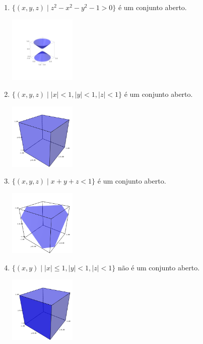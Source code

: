 \documentclass[../main.tex]{subfiles}
\begin{document}
		\begin{solucao}
			\begin{enumerate}[label=\alph*)]
				\item $\{(x,y,z) \mid z^2-x^2-y^2-1>0\}$ é um conjunto aberto.
				\begin{center}
					\includegraphics[width=0.25\textwidth]{imagens/lista03/picture_lista03.02_q02_item01.png}
				\end{center}
				\item $\{(x,y,z) \mid |x|<1, |y|<1, |z|<1\}$ é um conjunto aberto.
				\begin{center}
					\includegraphics[width=0.25\textwidth]{imagens/lista03/picture_lista03.02_q02_item02.png}
				\end{center}
				\item $\{(x,y,z) \mid x+y+z<1\}$ é um conjunto aberto.
				\begin{center}
					\includegraphics[width=0.25\textwidth]{imagens/lista03/picture_lista03.02_q02_item03.png}
				\end{center}
				\item $\{(x,y) \mid |x|\leq1, |y|<1, |z|<1\}$ não é um conjunto aberto.
				\begin{center}
					\includegraphics[width=0.25\textwidth]{imagens/lista03/picture_lista03.02_q02_item04.png}

\end{center}
\end{enumerate}
\end{solucao}
\end{document}
